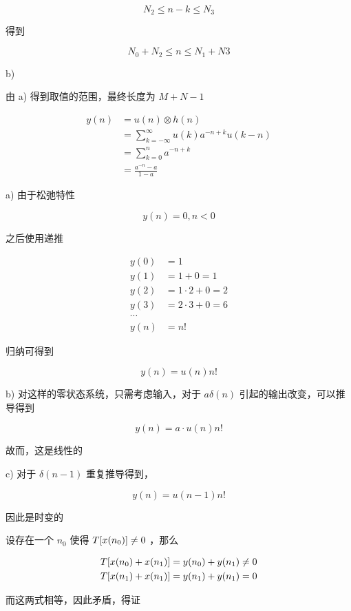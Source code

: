\documentclass[lang=cn,11pt,a4paper,cite=authoryear]{elegantpaper}
\begin{document}
\begin{multicols*}{2}
\[N_2 \leq n - k \leq N_3\] 

得到

\[N_0 + N_2 \leq n \leq N_1 + N3\]

b) 

由 a) 得到取值的范围，最终长度为 \(M+N-1\)


\[\begin{aligned}
    y(n) &= u(n) \otimes h(n) \\
    &= \sum_{k = -\infty}^{\infty} u(k) a^{-n+k} u(k-n)\\
    &= \sum_{k=0}^n a^{-n+k} \\ 
    &= \frac{a^{-n} - a}{1 - a}
\end{aligned}\]


a) 由于松弛特性

\[y(n) = 0, n < 0\]

之后使用递推

\[
\begin{aligned}
    y(0) &= 1\\ 
    y(1) &= 1 + 0 = 1\\
    y(2) &= 1 \cdot 2 + 0 = 2\\
    y(3) &= 2 \cdot 3 + 0 = 6\\
    \cdots\\
    y(n) &= n! 
\end{aligned}    
\]

归纳可得到 

\[y(n) = u(n) n!\]

b) 对这样的零状态系统，只需考虑输入，对于 \(a \delta(n)\)  引起的输出改变，可以推导得到

\[y(n) = a \cdot u(n) n!\]

故而，这是线性的

c) 对于 \(\delta(n-1)\) 重复推导得到，

\[y(n) = u(n-1) n!\]

因此是时变的


设存在一个 \(n_0\) 使得 \({T}[x(n_0)] \neq 0\) ，那么

\[\begin{aligned}
    {T}[x(n_0) + x(n_1)] &= y(n_0)+ y(n_1) \neq 0 \\
    {T}[x(n_1) + x(n_1)] &= y(n_1)+ y(n_1) = 0 
\end{aligned}\]

而这两式相等，因此矛盾，得证


\end{multicols*}
\end{document}
